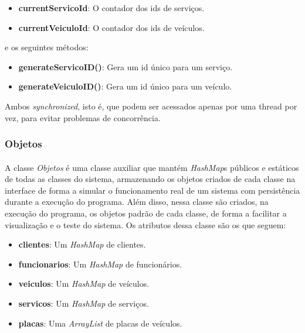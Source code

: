 \documentclass[a4paper,12pt]{article}
\begin{document}
\begin{itemize}[noitemsep]
    \item \textbf{currentServicoId}: O contador dos ids de serviços.
    \item \textbf{currentVeiculoId}: O contador dos ids de veículos.
\end{itemize}

\noindent e os seguintes métodos:

\begin{itemize}[noitemsep]
    \item \textbf{generateServicoID()}: Gera um id único para um serviço.
    \item \textbf{generateVeiculoID()}: Gera um id único para um veículo.
\end{itemize}

\noindent Ambos \textit{synchronized}, isto é, que podem ser acessados apenas por uma thread por vez, para evitar problemas de concorrência.

\subsubsection{Objetos}
\paragraph{}
A classe \textit{Objetos} é uma classe auxiliar que mantém \textit{HashMap}s públicos e estáticos de todas as classes do sistema, armazenando os objetos criados de cada classe na interface de forma a simular o funcionamento real de um sistema com persistência durante a execução do programa. Além disso, nessa classe são criados, na execução do programa, os objetos padrão de cada classe, de forma a facilitar a visualização e o teste do sistema. Os atributos dessa classe são os que seguem:

\begin{itemize}[noitemsep]
    \item \textbf{clientes}: Um \textit{HashMap} de clientes.
    \item \textbf{funcionarios}: Um \textit{HashMap} de funcionários.
    \item \textbf{veiculos}: Um \textit{HashMap} de veículos.
    \item \textbf{servicos}: Um \textit{HashMap} de serviços.
    \item \textbf{placas}: Uma \textit{ArrayList} de placas de veículos.
\end{itemize}
\end{document}
